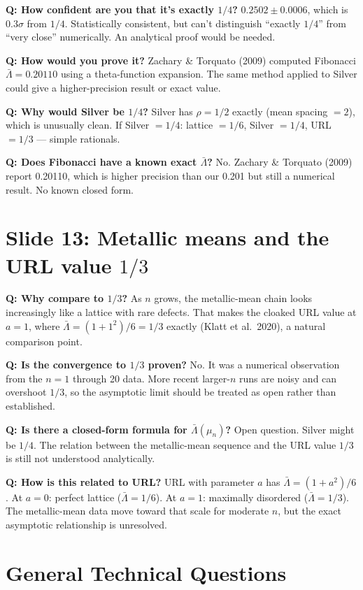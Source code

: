 \documentclass[11pt]{article}
\newcommand{\Q}[1]{\textcolor{qcolor}{\textbf{Q: #1}}}
\begin{document}
\Q{How confident are you that it's exactly $1/4$?}
$0.2502 \pm 0.0006$, which is $0.3\sigma$ from $1/4$. Statistically consistent, but can't distinguish ``exactly $1/4$'' from ``very close'' numerically. An analytical proof would be needed.

\Q{How would you prove it?}
Zachary \& Torquato (2009) computed Fibonacci $\bar\Lambda = 0.20110$ using a theta-function expansion. The same method applied to Silver could give a higher-precision result or exact value.

\Q{Why would Silver be $1/4$?}
Silver has $\rho = 1/2$ exactly (mean spacing $= 2$), which is unusually clean. If Silver $= 1/4$: lattice $= 1/6$, Silver $= 1/4$, URL $= 1/3$ --- simple rationals.

\Q{Does Fibonacci have a known exact $\bar\Lambda$?}
No. Zachary \& Torquato (2009) report 0.20110, which is higher precision than our 0.201 but still a numerical result. No known closed form.

\section{Slide 13: Metallic means and the URL value $1/3$}

\Q{Why compare to $1/3$?}
As $n$ grows, the metallic-mean chain looks increasingly like a lattice with rare defects. That makes the cloaked URL value at $a=1$, where $\bar\Lambda = (1+1^2)/6 = 1/3$ exactly (Klatt et al.\ 2020), a natural comparison point.

\Q{Is the convergence to $1/3$ proven?}
No. It was a numerical observation from the $n=1$ through 20 data. More recent larger-$n$ runs are noisy and can overshoot $1/3$, so the asymptotic limit should be treated as open rather than established.

\Q{Is there a closed-form formula for $\bar\Lambda(\mu_n)$?}
Open question. Silver might be $1/4$. The relation between the metallic-mean sequence and the URL value $1/3$ is still not understood analytically.

\Q{How is this related to URL?}
URL with parameter $a$ has $\bar\Lambda = (1+a^2)/6$. At $a=0$: perfect lattice ($\bar\Lambda = 1/6$). At $a=1$: maximally disordered ($\bar\Lambda = 1/3$). The metallic-mean data move toward that scale for moderate $n$, but the exact asymptotic relationship is unresolved.

\section{General Technical Questions}
\end{document}
